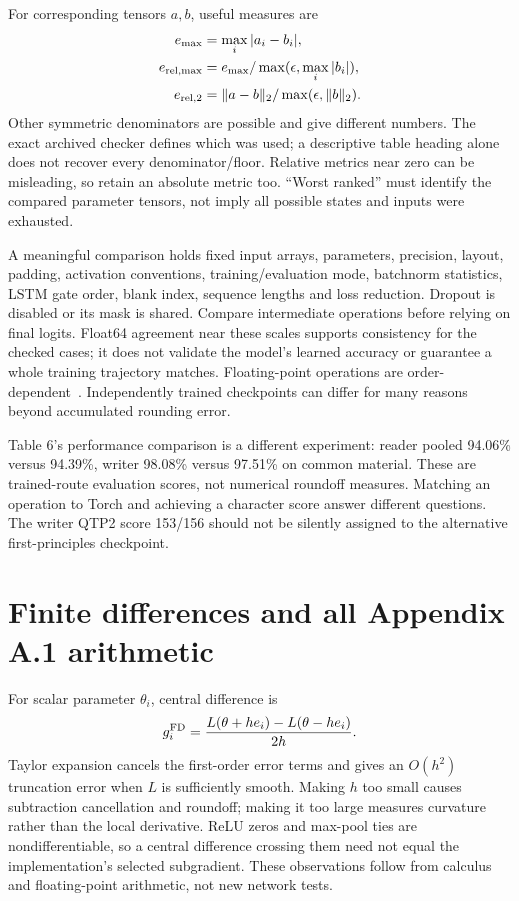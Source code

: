 For corresponding tensors $a,b$, useful measures are
\begin{align*}
e_{\max}&=\max_i|a_i-b_i|,\\
e_{\rm rel,max}&=e_{\max}/\max(\epsilon,\max_i|b_i|),\\
e_{\rm rel,2}&=\|a-b\|_2/\max(\epsilon,\|b\|_2).
\end{align*}
Other symmetric denominators are possible and give different numbers.
The exact archived checker defines which was used; a descriptive table
heading alone does not recover every denominator/floor. Relative metrics
near zero can be misleading, so retain an absolute metric too. ``Worst ranked''
must identify the compared parameter tensors, not imply all possible states
and inputs were exhausted.

A meaningful comparison holds fixed input arrays, parameters, precision,
layout, padding, activation conventions, training/evaluation mode, batchnorm
statistics, LSTM gate order, blank index, sequence lengths and loss reduction.
Dropout is disabled or its mask is shared. Compare intermediate operations
before relying on final logits. Float64 agreement near these scales supports
consistency for the checked cases; it does not validate the model's learned
accuracy or guarantee a whole training trajectory matches. Floating-point
operations are order-dependent~\cite{torchnumeric}. Independently trained
checkpoints can differ for many reasons beyond accumulated rounding error.

Table 6's performance comparison is a different experiment: reader pooled
94.06\% versus 94.39\%, writer 98.08\% versus 97.51\% on common material.
These are trained-route evaluation scores, not numerical roundoff measures.
Matching an operation to Torch and achieving a character score answer
different questions. The writer QTP2 score 153/156 should not be silently
assigned to the alternative first-principles checkpoint.

\section{Finite differences and all Appendix A.1 arithmetic}
For scalar parameter $\theta_i$, central difference is
\[
g_i^{\rm FD}={L(\theta+h e_i)-L(\theta-h e_i)\over2h}.
\]
Taylor expansion cancels the first-order error terms and gives an $O(h^2)$
truncation error when $L$ is sufficiently smooth. Making $h$ too small
causes subtraction cancellation and roundoff; making it too large measures
curvature rather than the local derivative. ReLU zeros and max-pool ties
are nondifferentiable, so a central difference crossing them need not equal
the implementation's selected subgradient. These observations follow from
calculus and floating-point arithmetic, not new network tests.


